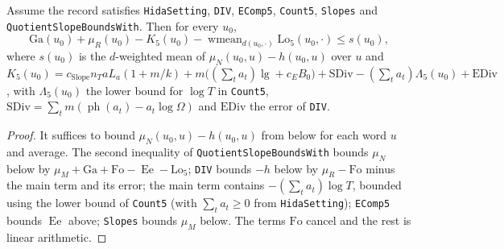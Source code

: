 \begin{lemma}\label{geob:slower}
Assume the record satisfies \texttt{HidaSetting}, \texttt{DIV}, \texttt{EComp5},
\texttt{Count5}, \texttt{Slopes} and \texttt{QuotientSlopeBoundsWith}. Then for
every $u_0$,
\[
\mathrm{Ga}(u_0)+\mu_R(u_0)-K_5(u_0)-\operatorname{wmean}_{d(u_0,\cdot)}\mathrm{Lo}_5(u_0,\cdot)\le s(u_0),
\]
where $s(u_0)$ is the $d$-weighted mean of $\mu_N(u_0,u)-h(u_0,u)$ over $u$ and
$K_5(u_0)=c_{\mathrm{Slope}}n_TaL_a(1+m/k)+m\bigl((\sum_ta_t)\lg+c_EB_0\bigr)+\mathrm{SDiv}-(\sum_ta_t)\Lambda_5(u_0)+\mathrm{EDiv}$,
with $\Lambda_5(u_0)$ the lower bound for $\log T$ in \texttt{Count5},
$\mathrm{SDiv}=\sum_t m(\operatorname{ph}(a_t)-a_t\log\Omega)$ and
$\mathrm{EDiv}$ the error of \texttt{DIV}.
\end{lemma}
\begin{proof}
It suffices to bound $\mu_N(u_0,u)-h(u_0,u)$ from below for each word $u$ and
average. The second inequality of \texttt{QuotientSlopeBoundsWith} bounds
$\mu_N$ below by $\mu_M+\mathrm{Ga}+\mathrm{Fo}-\operatorname{Ee}-\mathrm{Lo}_5$;
\texttt{DIV} bounds $-h$ below by $\mu_R-\mathrm{Fo}$ minus the main term and its
error; the main term contains $-(\sum_ta_t)\log T$, bounded using the lower
bound of \texttt{Count5} (with $\sum_ta_t\ge0$ from \texttt{HidaSetting});
\texttt{EComp5} bounds $\operatorname{Ee}$ above; \texttt{Slopes} bounds $\mu_M$
below. The terms $\mathrm{Fo}$ cancel and the rest is linear arithmetic.
\end{proof}

